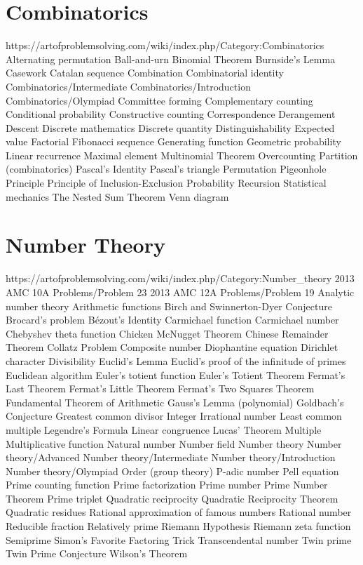 \section{Combinatorics}
https://artofproblemsolving.com/wiki/index.php/Category:Combinatorics
Alternating permutation
Ball-and-urn
Binomial Theorem
Burnside's Lemma
Casework
Catalan sequence
Combination
Combinatorial identity
Combinatorics/Intermediate
Combinatorics/Introduction
Combinatorics/Olympiad
Committee forming
Complementary counting
Conditional probability
Constructive counting
Correspondence
Derangement
Descent
Discrete mathematics
Discrete quantity
Distinguishability
Expected value
Factorial
Fibonacci sequence
Generating function
Geometric probability
Linear recurrence
Maximal element
Multinomial Theorem
Overcounting
Partition (combinatorics)
Pascal's Identity
Pascal's triangle
Permutation
Pigeonhole Principle
Principle of Inclusion-Exclusion
Probability
Recursion
Statistical mechanics
The Nested Sum Theorem
Venn diagram

\section{Number Theory}
https://artofproblemsolving.com/wiki/index.php/Category:Number_theory
2013 AMC 10A Problems/Problem 23
2013 AMC 12A Problems/Problem 19
Analytic number theory
Arithmetic functions
Birch and Swinnerton-Dyer Conjecture
Brocard's problem
Bézout's Identity
Carmichael function
Carmichael number
Chebyshev theta function
Chicken McNugget Theorem
Chinese Remainder Theorem
Collatz Problem
Composite number
Diophantine equation
Dirichlet character
Divisibility
Euclid's Lemma
Euclid's proof of the infinitude of primes
Euclidean algorithm
Euler's totient function
Euler's Totient Theorem
Fermat's Last Theorem
Fermat's Little Theorem
Fermat's Two Squares Theorem
Fundamental Theorem of Arithmetic
Gauss's Lemma (polynomial)
Goldbach's Conjecture
Greatest common divisor
Integer
Irrational number
Least common multiple
Legendre's Formula
Linear congruence
Lucas' Theorem
Multiple
Multiplicative function
Natural number
Number field
Number theory
Number theory/Advanced
Number theory/Intermediate
Number theory/Introduction
Number theory/Olympiad
Order (group theory)
P-adic number
Pell equation
Prime counting function
Prime factorization
Prime number
Prime Number Theorem
Prime triplet
Quadratic reciprocity
Quadratic Reciprocity Theorem
Quadratic residues
Rational approximation of famous numbers
Rational number
Reducible fraction
Relatively prime
Riemann Hypothesis
Riemann zeta function
Semiprime
Simon's Favorite Factoring Trick
Transcendental number
Twin prime
Twin Prime Conjecture
Wilson's Theorem
